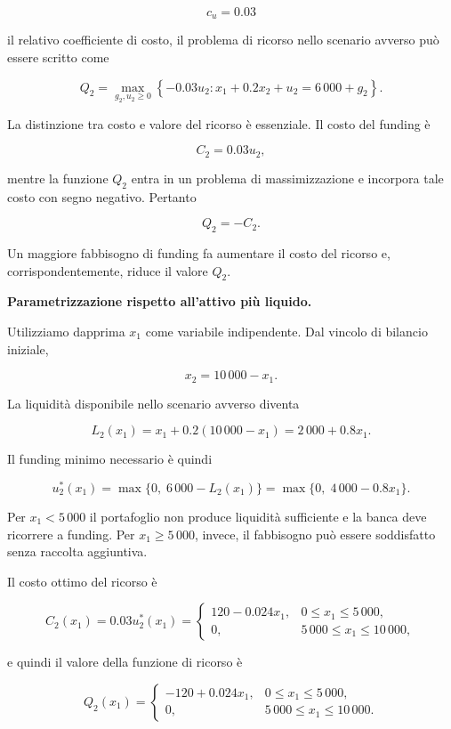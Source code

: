 \[
c_u=0.03
\]

il relativo coefficiente di costo, il problema di ricorso nello scenario
avverso pu\`o essere scritto come

\[
Q_2
=
\max_{g_2,u_2\geq0}
\left\{
-0.03u_2:
x_1+0.2x_2+u_2=6\,000+g_2
\right\}.
\]

La distinzione tra costo e valore del ricorso \`e essenziale. Il costo del
funding \`e

\[
C_2=0.03u_2,
\]

mentre la funzione $Q_2$ entra in un problema di massimizzazione e incorpora
tale costo con segno negativo. Pertanto

\[
Q_2=-C_2.
\]

Un maggiore fabbisogno di funding fa aumentare il costo del ricorso e,
corrispondentemente, riduce il valore $Q_2$.

\medskip

\noindent
\textbf{Parametrizzazione rispetto all'attivo pi\`u liquido.}

Utilizziamo dapprima $x_1$ come variabile indipendente. Dal vincolo di
bilancio iniziale,

\[
x_2=10\,000-x_1.
\]

La liquidit\`a disponibile nello scenario avverso diventa

\[
L_2(x_1)
=
x_1+0.2(10\,000-x_1)
=
2\,000+0.8x_1.
\]

Il funding minimo necessario \`e quindi

\[
u_2^*(x_1)
=
\max\{0,\;6\,000-L_2(x_1)\}
=
\max\{0,\;4\,000-0.8x_1\}.
\]

Per $x_1<5\,000$ il portafoglio non produce liquidit\`a sufficiente e la
banca deve ricorrere a funding. Per $x_1\geq5\,000$, invece, il fabbisogno
pu\`o essere soddisfatto senza raccolta aggiuntiva.

Il costo ottimo del ricorso \`e

\[
C_2(x_1)
=
0.03u_2^*(x_1)
=
\begin{cases}
120-0.024x_1, & 0\leq x_1\leq5\,000,\\[4pt]
0, & 5\,000\leq x_1\leq10\,000,
\end{cases}
\]

e quindi il valore della funzione di ricorso \`e

\[
Q_2(x_1)
=
\begin{cases}
-120+0.024x_1, & 0\leq x_1\leq5\,000,\\[4pt]
0, & 5\,000\leq x_1\leq10\,000.
\end{cases}
\]

